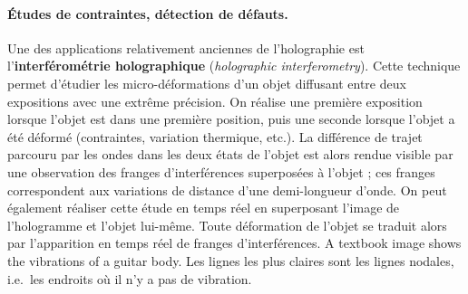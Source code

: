 \paragraph{Études de contraintes, détection de défauts.}
Une des applications relativement anciennes de l'holographie est
l'\textbf{interférométrie holographique} (\textit{holographic interferometry}).
Cette technique permet d'étudier les micro-déformations d'un objet diffusant
entre deux expositions avec une extrême précision. On réalise une première
exposition lorsque l'objet est dans une première position, puis une seconde
lorsque l'objet a été déformé (contraintes, variation thermique, etc.). La
différence de trajet parcouru par les ondes dans les deux états de l'objet est
alors rendue visible par une observation des franges d'interférences
superposées à l'objet ; ces franges correspondent aux variations de distance
d'une demi-longueur d'onde. On peut également réaliser cette étude en temps réel
en superposant l'image de l'hologramme et l'objet lui-même. Toute déformation de
l'objet se traduit alors par l'apparition en temps réel de franges
d'interférences. A textbook image shows the vibrations of a guitar body. Les
lignes les plus claires sont les lignes nodales, i.e.\ les endroits où il n'y a
pas de vibration.

